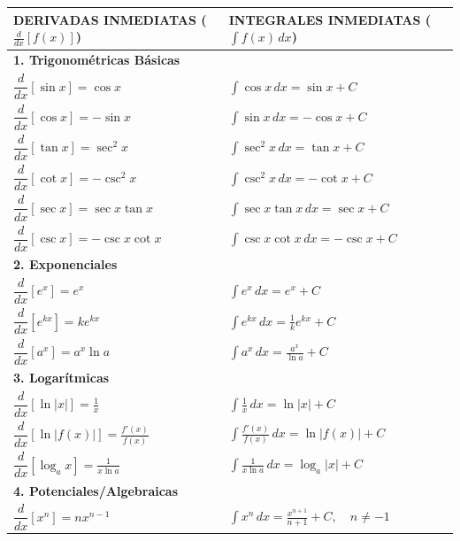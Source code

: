 \documentclass{article}
\newcommand{\deriv}[2]{\frac{d#1}{d#2}}
\newcommand{\integral}[2]{\int #1 \, d#2}
\newcommand{\tablerowcolors}{\rowcolors{2}{gray!10}{white}}
\begin{document}
\begin{center}
\footnotesize
\setlength{\tabcolsep}{6pt}
\tablerowcolors
\begin{tabular}{p{}p{}}
\toprule
\textbf{DERIVADAS INMEDIATAS} ($\deriv{}{x}[f(x)]$) & \textbf{INTEGRALES INMEDIATAS} ($\integral{f(x)}{x}$) \\
\midrule
\multicolumn{2}{l}{\textbf{1. Trigonométricas Básicas}} \\
\midrule
$\dfrac{d}{dx}[\sin x] = \cos x$ & $\displaystyle\int \cos x \, dx = \sin x + C$ \\
$\dfrac{d}{dx}[\cos x] = -\sin x$ & $\displaystyle\int \sin x \, dx = -\cos x + C$ \\
$\dfrac{d}{dx}[\tan x] = \sec^2 x$ & $\displaystyle\int \sec^2 x \, dx = \tan x + C$ \\
$\dfrac{d}{dx}[\cot x] = -\csc^2 x$ & $\displaystyle\int \csc^2 x \, dx = -\cot x + C$ \\
$\dfrac{d}{dx}[\sec x] = \sec x \tan x$ & $\displaystyle\int \sec x \tan x \, dx = \sec x + C$ \\
$\dfrac{d}{dx}[\csc x] = -\csc x \cot x$ & $\displaystyle\int \csc x \cot x \, dx = -\csc x + C$ \\
\midrule
\multicolumn{2}{l}{\textbf{2. Exponenciales}} \\
\midrule
$\dfrac{d}{dx}[e^x] = e^x$ & $\displaystyle\int e^x \, dx = e^x + C$ \\
$\dfrac{d}{dx}[e^{kx}] = ke^{kx}$ & $\displaystyle\int e^{kx} \, dx = \frac{1}{k}e^{kx} + C$ \\
$\dfrac{d}{dx}[a^x] = a^x \ln a$ & $\displaystyle\int a^x \, dx = \frac{a^x}{\ln a} + C$ \\
\midrule
\multicolumn{2}{l}{\textbf{3. Logarítmicas}} \\
\midrule
$\dfrac{d}{dx}[\ln|x|] = \frac{1}{x}$ & $\displaystyle\int \frac{1}{x} \, dx = \ln|x| + C$ \\
$\dfrac{d}{dx}[\ln|f(x)|] = \frac{f'(x)}{f(x)}$ & $\displaystyle\int \frac{f'(x)}{f(x)} \, dx = \ln|f(x)| + C$ \\
$\dfrac{d}{dx}[\log_a x] = \frac{1}{x \ln a}$ & $\displaystyle\int \frac{1}{x \ln a} \, dx = \log_a |x| + C$ \\
\midrule
\multicolumn{2}{l}{\textbf{4. Potenciales/Algebraicas}} \\
\midrule
$\dfrac{d}{dx}[x^n] = nx^{n-1}$ & $\displaystyle\int x^n \, dx = \frac{x^{n+1}}{n+1} + C, \quad n \neq -1$ \\

\end{tabular}
\end{center}
\end{document}
